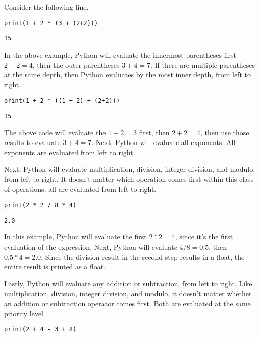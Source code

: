 Consider the following line.
\begin{lstlisting}[style=pippython]
print(1 + 2 * (3 + (2+2)))
\end{lstlisting}
\begin{lstlisting}[style=none]
15
\end{lstlisting}
In the above example, Python will evaluate the innermost parentheses first $2 + 2 = 4$, then the outer parentheses $3 + 4 = 7$. If there are multiple parentheses at the same depth, then Python evaluates by the most inner depth, from left to right.\par
\begin{lstlisting}[style=pippython]
print(1 + 2 * ((1 + 2) + (2+2)))
\end{lstlisting}
\begin{lstlisting}[style=none]
15
\end{lstlisting}
The above code will evaluate the $1 + 2 = 3$ first, then $2 + 2 = 4$, then use those results to evaluate $3 + 4 = 7$.
Next, Python will evaluate all exponents. All exponents are evaluated from left to right.\par
Next, Python will evaluate multiplication, division, integer division, and modulo, from left to right. It doesn't matter which operation comes first within this class of operations, all are evaluated from left to right.\par
\begin{lstlisting}[style=pippython]
print(2 * 2 / 8 * 4)
\end{lstlisting}
\begin{lstlisting}[style=none]
2.0
\end{lstlisting}
In this example, Python will evaluate the first $2 * 2 = 4$, since it's the first evaluation of the expression. Next, Python will evaluate $4 / 8 = 0.5$, then $0.5 * 4 = 2.0$. Since the division result in the second step results in a float, the entire result is printed as a float.\par
Lastly, Python will evaluate any addition or subtraction, from left to right. Like multiplication, division, integer division, and modulo, it doesn't matter whether an addition or subtraction operator comes first. Both are evaluated at the same priority level.\par
\begin{lstlisting}[style=pippython]
print(2 + 4 - 3 + 8)
\end{lstlisting}
